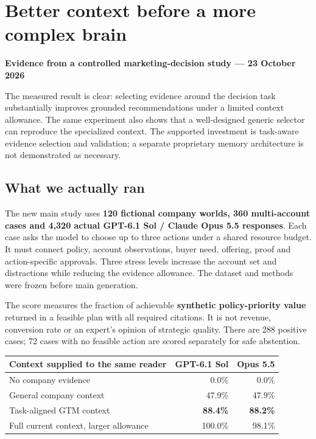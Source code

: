 \documentclass[
  11pt,
]{article}
\author{}
\date{}
\begin{document}
\section{Better context before a more complex
brain}\label{better-context-before-a-more-complex-brain}

\textbf{Evidence from a controlled marketing-decision study --- 23
October 2026}

The measured result is clear: selecting evidence around the decision
task substantially improves grounded recommendations under a limited
context allowance. The same experiment also shows that a well-designed
generic selector can reproduce the specialized context. The supported
investment is task-aware evidence selection and validation; a separate
proprietary memory architecture is not demonstrated as necessary.

\subsection{What we actually ran}\label{what-we-actually-ran}

The new main study uses \textbf{120 fictional company worlds, 360
multi-account cases and 4,320 actual GPT-6.1 Sol / Claude Opus 5.5
responses}. Each case asks the model to choose up to three actions under
a shared resource budget. It must connect policy, account observations,
buyer need, offering, proof and action-specific approvals. Three stress
levels increase the account set and distractions while reducing the
evidence allowance. The dataset and methods were frozen before main
generation.

The score measures the fraction of achievable \textbf{synthetic
policy-priority value} returned in a feasible plan with all required
citations. It is not revenue, conversion rate or an expert's opinion of
strategic quality. There are 288 positive cases; 72 cases with no
feasible action are scored separately for safe abstention.

\begin{longtable}[]{@{}lrr@{}}
\toprule\noalign{}
Context supplied to the same reader & GPT-6.1 Sol & Opus 5.5 \\
\midrule\noalign{}
\endhead
\bottomrule\noalign{}
\endlastfoot
No company evidence & 0.0\% & 0.0\% \\
General company context & 47.9\% & 47.9\% \\
Task-aligned GTM context & \textbf{88.4\%} & \textbf{88.2\%} \\
Full current context, larger allowance & 100.0\% & 98.1\% \\
\end{longtable}
\end{document}
